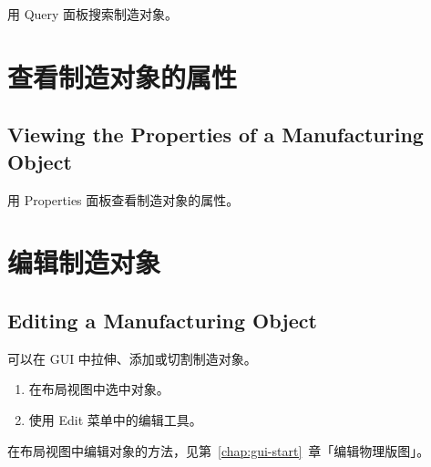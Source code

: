 用 Query 面板搜索制造对象。

\section{查看制造对象的属性}
\subsection*{Viewing the Properties of a Manufacturing Object}

用 Properties 面板查看制造对象的属性。

\section{编辑制造对象}
\subsection*{Editing a Manufacturing Object}

可以在 GUI 中拉伸、添加或切割制造对象。
\begin{enumerate}
  \item 在布局视图中选中对象。
  \item 使用 Edit 菜单中的编辑工具。
\end{enumerate}

在布局视图中编辑对象的方法，见第~\ref{chap:gui-start}~章「编辑物理版图」。
